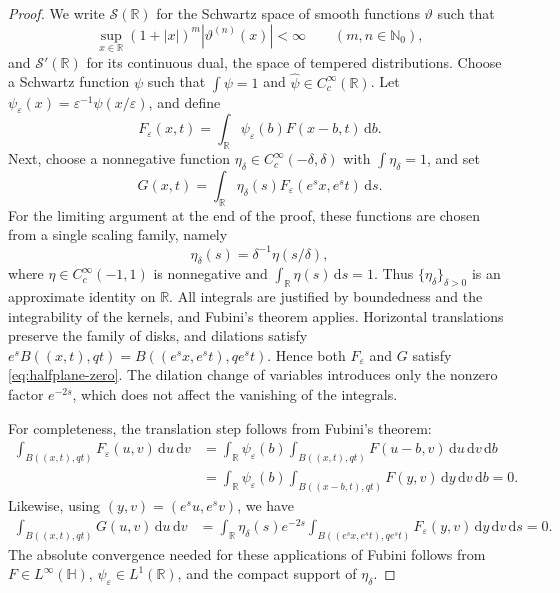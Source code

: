 \documentclass[10pt,a4paper]{amsart}
\newcommand{\dd}{\,\mathrm d}
\begin{document}
\begin{proof}
We write $\mathcal S(\mathbb R)$ for the Schwartz space of
smooth functions $\vartheta$ such that
\[
\sup_{x\in\mathbb R}
(1+|x|)^m |\vartheta^{(n)}(x)|<\infty
\qquad (m,n\in\mathbb N_0),
\]
and $\mathcal S'(\mathbb R)$ for its continuous dual,
the space of tempered distributions. Choose a Schwartz function $\psi$ such that $\int\psi=1$ and $\widehat\psi\in C_c^\infty(\mathbb R)$.
Let $\psi_\varepsilon(x)=\varepsilon^{-1}\psi(x/\varepsilon)$, and define
\[
F_\varepsilon(x,t)=\int_{\mathbb R}\psi_\varepsilon(b)F(x-b,t)\dd b.
\]
Next, choose a nonnegative function $\eta_\delta\in C_c^\infty(-\delta,\delta)$ with $\int\eta_\delta=1$, and set
\begin{equation}\label{eq:single-regularize}
G(x,t)=\int_{\mathbb R}\eta_\delta(s)F_\varepsilon(e^sx,e^st)\dd s.
\end{equation}
For the limiting argument at the end of the proof, these functions are chosen from a single scaling family, namely
\[
\eta_\delta(s)=\delta^{-1}\eta(s/\delta),
\]
where $\eta\in C_c^\infty(-1,1)$ is nonnegative and
$\int_{\mathbb R}\eta(s)\dd s=1$. Thus $\{\eta_\delta\}_{\delta>0}$ is an
approximate identity on $\mathbb R$.
All integrals are justified by boundedness and the integrability of the kernels, and Fubini's theorem applies.
Horizontal translations preserve the family of disks, and dilations satisfy
$e^s B((x,t),qt)=B((e^sx,e^st),qe^st)$.
Hence both $F_\varepsilon$ and $G$ satisfy \eqref{eq:halfplane-zero}.
The dilation change of variables introduces only the nonzero factor $e^{-2s}$, which does not affect the vanishing of the integrals.

For completeness, the translation step follows from Fubini's theorem:
\begin{align*}
\int_{B((x,t),qt)}F_\varepsilon(u,v)\dd u\dd v
&=\int_{\mathbb R}\psi_\varepsilon(b)
  \int_{B((x,t),qt)}F(u-b,v)\dd u\dd v\dd b\\
&=\int_{\mathbb R}\psi_\varepsilon(b)
  \int_{B((x-b,t),qt)}F(y,v)\dd y\dd v\dd b=0.
\end{align*}
Likewise, using $(y,v)=(e^su,e^sv)$, we have
\begin{align*}
\int_{B((x,t),qt)}G(u,v)\dd u\dd v
&=\int_{\mathbb R}\eta_\delta(s)e^{-2s}
  \int_{B((e^sx,e^st),qe^st)}F_\varepsilon(y,v)\dd y\dd v\dd s=0.
\end{align*}
The absolute convergence needed for these applications of Fubini follows from
$F\in L^\infty(\mathbb H)$, $\psi_\varepsilon\in L^1(\mathbb R)$, and the
compact support of $\eta_\delta$.



\end{proof}
\end{document}
